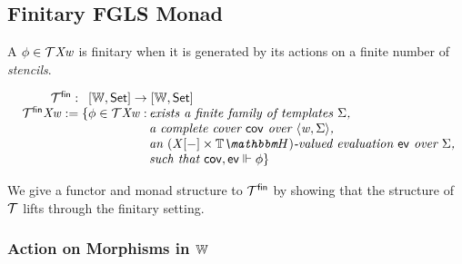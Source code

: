 
\subsection{Finitary FGLS Monad}
\label{sec:finitary-monad}

A $\phi \in \mathcal{T}\mathit{X}\mathit{w}$ is finitary when it is generated by its actions on a finite number of \emph{stencils}. 

\begin{definition}
\[\begin{array}{r@{\;}l@{\,}l@{\,}}
    \monFLSFin         :& \multicolumn{2}{l}{\funC\worldC\setC \to \funC\worldC\setC} \\
    \monFLSFin\vX\vw   \eqdef& \{ \phi \in \monFLS\vX\vw :& \textit{exists a finite family of templates $\Sigma$,} \\
                       &&                                   \textit{a complete cover $\cov$ over $\pair\vw\Sigma$,} \\
                       &&                                   \textit{an $(\vX\anyL\dash \times \theapF)$-valued evaluation $\ev$ over $\Sigma$,} \\
                       &&                                   \textit{such that $\cov,\ev \Vdash \phi$} \}
\end{array}\]
\end{definition}
We give a functor and monad structure to $\mathcal{T}^{\mathsf{fin}}$ by showing that the structure of $\mathcal{T}$ lifts through the finitary setting. 

\subsubsection[Action on Morphisms in W]{Action on Morphisms in $\mathbb{W}$}

